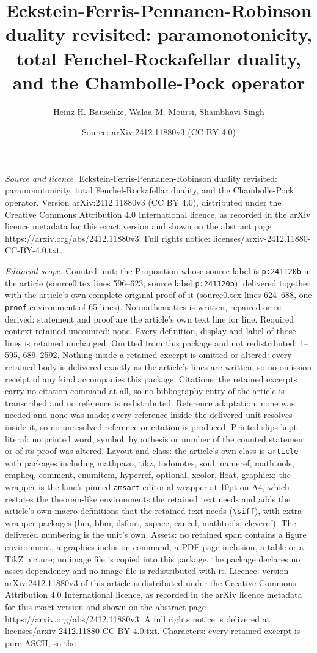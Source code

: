 \documentclass[10pt,a4paper]{amsart}
\title[Eckstein-Ferris-Pennanen-Robinson duality revisited: paramon]{Eckstein-Ferris-Pennanen-Robinson duality revisited: paramonotonicity, total Fenchel-Rockafellar duality, and the Chambolle-Pock operator}
\author{Heinz H. Bauschke, Walaa M. Moursi, Shambhavi Singh}
\date{Source: arXiv:2412.11880v3 (CC BY 4.0)}
\begin{document}
\maketitle

\noindent\emph{Source and licence.} Eckstein-Ferris-Pennanen-Robinson duality revisited: paramonotonicity, total Fenchel-Rockafellar duality, and the Chambolle-Pock operator. Version arXiv:2412.11880v3 (CC BY 4.0), distributed under the Creative Commons Attribution 4.0 International licence, as recorded in the arXiv licence metadata for this exact version and shown on the abstract page https://arxiv.org/abs/2412.11880v3. Full rights notice: licenses/arxiv-2412.11880-CC-BY-4.0.txt.\par\smallskip

\noindent\textit{Editorial scope.} Counted unit: the Proposition whose source label is \texttt{p:241120b} in the article (source0.tex lines 596--623, source label \texttt{p:241120b}), delivered together with the article's own complete original proof of it (source0.tex lines 624--688, one \texttt{proof} environment of 65 lines). No mathematics is written, repaired or re-derived: statement and proof are the article's own text line for line. Required context retained uncounted: none. Every definition, display and label of those lines is retained unchanged. Omitted from this package and not redistributed: 1--595, 689--2592. Nothing inside a retained excerpt is omitted or altered: every retained body is delivered exactly as the article's lines are written, so no omission receipt of any kind accompanies this package. Citations: the retained excerpts carry no citation command at all, so no bibliography entry of the article is transcribed and no reference is redistributed. Reference adaptation: none was needed and none was made; every reference inside the delivered unit resolves inside it, so no unresolved reference or citation is produced. Printed slips kept literal: no printed word, symbol, hypothesis or number of the counted statement or of its proof was altered. Layout and class: the article's own class is \texttt{article} with packages including mathpazo, tikz, todonotes, soul, nameref, mathtools, empheq, comment, enumitem, hyperref, optional, xcolor, float, graphicx; the wrapper is the lane's pinned \texttt{amsart} editorial wrapper at 10pt on A4, which restates the theorem-like environments the retained text needs and adds the article's own macro definitions that the retained text needs (\texttt{\textbackslash siff}), with extra wrapper packages (bm, bbm, dsfont, xspace, cancel, mathtools, cleveref). The delivered numbering is the unit's own. Assets: no retained span contains a figure environment, a graphics-inclusion command, a PDF-page inclusion, a table or a TikZ picture; no image file is copied into this package, the package declares no asset dependency and no image file is redistributed with it. Licence: version arXiv:2412.11880v3 of this article is distributed under the Creative Commons Attribution 4.0 International licence, as recorded in the arXiv licence metadata for this exact version and shown on the abstract page https://arxiv.org/abs/2412.11880v3. A full rights notice is delivered at licenses/arxiv-2412.11880-CC-BY-4.0.txt. Characters: every retained excerpt is pure ASCII, so the 
\end{document}
